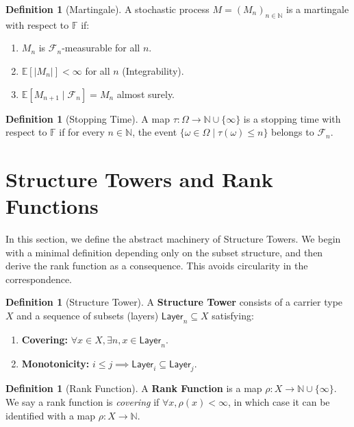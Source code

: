 \documentclass[11pt, a4paper]{article}
\newcommand{\layer}[1]{\mathsf{Layer}_{#1}}
\newcommand{\rank}{\rho}
\newcommand{\Filtration}{\mathbb{F}}
\newcommand{\CondExp}[2]{\mathbb{E}[#1 \mid \mathcal{F}_{#2}]}
\newcommand{\Nat}{\mathbb{N}}
\newcommand{\Ex}{\mathbb{E}}
\theoremstyle{plain}
\theoremstyle{definition}
\newtheorem{definition}[theorem]{Definition}
\theoremstyle{remark}
\begin{document}
\begin{definition}[Martingale]
A stochastic process $M = (M_n)_{n \in \Nat}$ is a martingale with respect to $\Filtration$ if:
\begin{enumerate}
    \item $M_n$ is $\mathcal{F}_n$-measurable for all $n$.
    \item $\Ex[|M_n|] < \infty$ for all $n$ (Integrability).
    \item $\CondExp{M_{n+1}}{n} = M_n$ almost surely.
\end{enumerate}
\end{definition}

\begin{definition}[Stopping Time]
A map $\tau: \Omega \to \Nat \cup \{\infty\}$ is a stopping time with respect to $\Filtration$ if for every $n \in \Nat$, the event $\{\omega \in \Omega \mid \tau(\omega) \le n\}$ belongs to $\mathcal{F}_n$.
\end{definition}

\section{Structure Towers and Rank Functions} \label{sec:ranktower}

In this section, we define the abstract machinery of Structure Towers. We begin with a minimal definition depending only on the subset structure, and then derive the rank function as a consequence. This avoids circularity in the correspondence.

\begin{definition}[Structure Tower]
A \textbf{Structure Tower} consists of a carrier type $X$ and a sequence of subsets (layers) $\layer{n} \subseteq X$ satisfying:
\begin{enumerate}
    \item \textbf{Covering:} $\forall x \in X, \exists n, x \in \layer{n}$.
    \item \textbf{Monotonicity:} $i \le j \implies \layer{i} \subseteq \layer{j}$.
\end{enumerate}
\end{definition}

\begin{definition}[Rank Function]
A \textbf{Rank Function} is a map $\rank: X \to \Nat \cup \{\infty\}$. We say a rank function is \textit{covering} if $\forall x, \rank(x) < \infty$, in which case it can be identified with a map $\rank: X \to \Nat$.
\end{definition}
\end{document}
